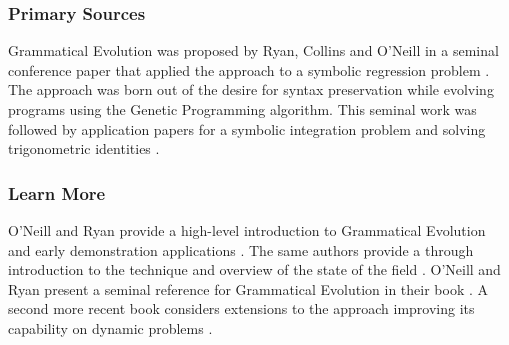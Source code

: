 % 
% 
\subsubsection{Primary Sources}
Grammatical Evolution was proposed by Ryan, Collins and O'Neill in a seminal conference paper that applied the approach to a symbolic regression problem \cite{Ryan1998a}. 
The approach was born out of the desire for syntax preservation while evolving programs using the Genetic Programming algorithm.
This seminal work was followed by application papers for a symbolic integration problem \cite{O'Neill1998, O'Neill1998a} and solving trigonometric identities \cite{Ryan1998}.

% 
% 
\subsubsection{Learn More}
O'Neill and Ryan provide a high-level introduction to Grammatical Evolution and early demonstration applications \cite{O'Neill1999}. The same authors provide a through introduction to the technique and overview of the state of the field \cite{O'Neill2001}.
O'Neill and Ryan present a seminal reference for Grammatical Evolution in their book \cite{O'Neill2003}. A second more recent book considers extensions to the approach improving its capability on dynamic problems \cite{Dempsey2009}.